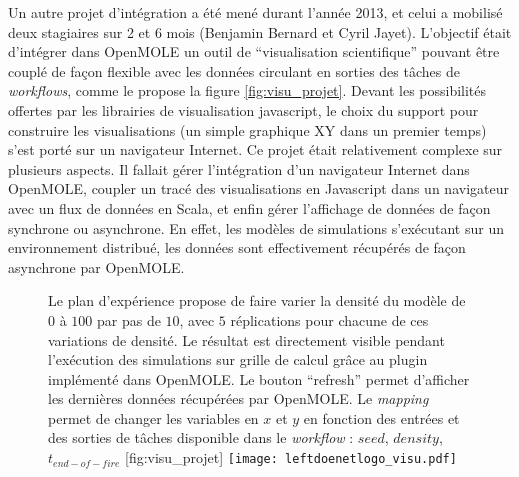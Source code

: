 Un autre projet d'intégration a été mené durant l'année 2013, et celui a mobilisé deux stagiaires sur 2 et 6 mois (Benjamin Bernard et Cyril Jayet). L'objectif était d'intégrer dans OpenMOLE un outil de \enquote{visualisation scientifique} pouvant être couplé de façon flexible avec les données circulant en sorties des tâches de \textit{workflows}, comme le propose la figure \ref{fig:visu_projet}. Devant les possibilités offertes par les librairies de visualisation javascript, le choix du support pour construire les visualisations (un simple graphique XY dans un premier temps) s'est porté sur un navigateur Internet. Ce projet était relativement complexe sur plusieurs aspects. Il fallait gérer l'intégration d'un navigateur Internet dans OpenMOLE, coupler un tracé des visualisations en Javascript dans un navigateur avec un flux de données en Scala, et enfin gérer l'affichage de données de façon synchrone ou asynchrone. En effet, les modèles de simulations s'exécutant sur un environnement distribué, les données sont effectivement récupérés de façon asynchrone par OpenMOLE.

\begin{figure}[htbp]
	\begin{sidecaption}[fortoc]{Le plan d'expérience propose de faire varier la densité du modèle de $0$ à $100$ par pas de $10$, avec $5$ réplications pour chacune de ces variations de densité. Le résultat est directement visible pendant l'exécution des simulations sur grille de calcul grâce au plugin implémenté dans OpenMOLE. Le bouton \foreignquote{english}{refresh} permet d'afficher les dernières données récupérées par OpenMOLE. Le \textit{mapping} permet de changer les variables en $x$ et $y$ en fonction des entrées et des sorties de tâches disponible dans le \textit{workflow} : $seed$, $density$, $t_{end-of-fire}$ }[fig:visu_projet]
		\centering
		\texttt{[image: leftdoenetlogo\_visu.pdf]}
  \end{sidecaption}
\end{figure}

